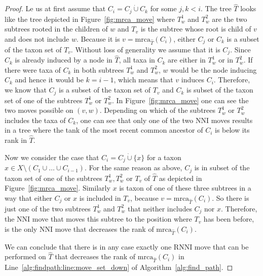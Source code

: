 \documentclass{amsart}
\newcommand{\mrca}{\mathrm{mrca}}
\newcommand{\nni}{\mathrm{NNI}}
\newcommand{\rnni}{\mathrm{RNNI}}
\begin{document}
\begin{proof}
    Le us at first assume that $C_i = C_j \dot\cup C_k$ for some $j,k < i$.
    The tree $\hat T$ looks like the tree depicted in Figure~\ref{fig:mrca_move} where $T_w^1$ and $T_w^2$ are the two subtrees rooted in the children of $w$ and $T_v$ is the subtree whose root is child of $v$ and does not include $w$.
    Because it is $v = \mrca_{\hat T}(C_i)$, either $C_j$ or $C_k$ is a subset of the taxon set of $T_v$.
    Without loss of generality we assume that it is $C_j$.
    Since $C_k$ is already induced by a node in $\hat T$, all taxa in $C_k$ are either in $T_w^1$ or in $T_w^2$.
    If there were taxa of $C_k$ in both subtrees $T_w^1$ and $T_w^2$, $w$ would be the node inducing $C_k$ and hence it would be $k = i-1$, which means that $v$ induces $C_i$.
    Therefore, we know that $C_j$ is a subset of the taxon set of $T_v$ and $C_k$ is subset of the taxon set of one of the subtrees $T_w^1$ or $T_w^2$.
    In Figure~\ref{fig:mrca_move} one can see the two moves possible on $(v,w)$.
    Depending on which of the subtrees $T_w^1$ or $T_w^2$ includes the taxa of $C_k$, one can see that only one of the two $\nni$ moves results in a tree where the tank of the most recent common ancestor of $C_i$ is below its rank in $\hat T$.

    Now we consider the case that $C_i = C_j \dot\cup \{x\}$ for a taxon $x \in X \setminus (C_1 \cup \ldots \cup C_{i-1})$.
    For the same reason as above, $C_j$ is in subset of the taxon set of one of the subtrees $T_w^1, T_w^2$ or $T_v$ of $\hat T$ as depicted in Figure~\ref{fig:mrca_move}.
    Similarly $x$ is taxon of one of these three subtrees in a way that either $C_j$ or $x$ is included in $T_v$, because $v = \mrca_{\hat T}(C_i)$.
    So there is just one of the two subtrees $T_w^1$ and $T_w^2$ that neither includes $C_j$ nor $x$.
    Therefore, the $\nni$ move that moves this subtree to the position where $T_v$ has been before, is the only $\nni$ move that decreases the rank of $\mrca_{\hat T}(C_i)$.

    We can conclude that there is in any case exactly one $\rnni$ move that can be performed on $\hat T$ that decreases the rank of $\mrca_{\hat T}(C_i)$ in Line~\ref{alg:findpath:line:move_set_down} of Algorithm~\ref{alg:find_path}.


\end{proof}
\end{document}
